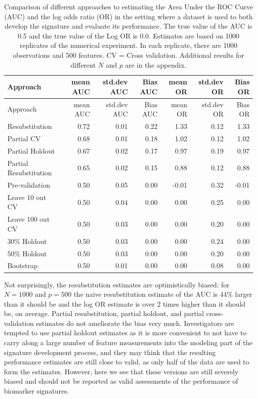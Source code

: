 \documentclass[11pt,]{article}
\begin{document}
\begin{longtable}[c]{@{}lrrrrrr@{}}
\caption{Comparison of different approaches to estimating the Area Under
the ROC Curve (AUC) and the log odds ratio (OR) in the setting where a
dataset is used to both develop the signature and evaluate its
performance. The true value of the AUC is 0.5 and the true value of the
Log OR is 0.0. Estimates are based on 1000 replicates of the numerical
experiment. In each replicate, there are 1000 observations and 500
features. CV = Cross validation. Additional results for different \(N\)
and \(p\) are in the appendix.}\tabularnewline
\toprule
Approach & mean AUC & std.dev AUC & Bias AUC & mean OR & std.dev OR &
Bias OR\tabularnewline
\midrule
\endfirsthead
\toprule
Approach & mean AUC & std.dev AUC & Bias AUC & mean OR & std.dev OR &
Bias OR\tabularnewline
\midrule
\endhead
Resubstitution & 0.72 & 0.01 & 0.22 & 1.33 & 0.12 & 1.33\tabularnewline
Partial CV & 0.68 & 0.01 & 0.18 & 1.02 & 0.12 & 1.02\tabularnewline
Partial Holdout & 0.67 & 0.02 & 0.17 & 0.97 & 0.19 & 0.97\tabularnewline
Partial Resubstitution & 0.65 & 0.02 & 0.15 & 0.88 & 0.12 &
0.88\tabularnewline
Pre-validation & 0.50 & 0.05 & 0.00 & -0.01 & 0.32 &
-0.01\tabularnewline
Leave 10 out CV & 0.50 & 0.04 & 0.00 & 0.00 & 0.25 & 0.00\tabularnewline
Leave 100 out CV & 0.50 & 0.03 & 0.00 & 0.00 & 0.20 &
0.00\tabularnewline
30\% Holdout & 0.50 & 0.03 & 0.00 & 0.00 & 0.24 & 0.00\tabularnewline
50\% Holdout & 0.50 & 0.03 & 0.00 & 0.00 & 0.20 & 0.00\tabularnewline
Bootstrap & 0.50 & 0.01 & 0.00 & 0.00 & 0.08 & 0.00\tabularnewline
\bottomrule
\end{longtable}

Not surprisingly, the resubstitution estimates are optimistically
biased: for \(N = 1000\) and \(p = 500\) the naive resubstitution
estimate of the AUC is 44\% larger than it should be and the log OR
estimate is over 2 times higher than it should be, on average. Partial
resubstitution, partial holdout, and partial cross-validation estimates
do not ameliorate the bias very much. Investigators are tempted to use
partial holdout estimates as it is more convenient to not have to carry
along a large number of feature measurements into the modeling part of
the signature development process, and they may think that the resulting
performance estimates are still close to valid, as only half of the data
are used to form the estimates. However, here we see that these versions
are still severely biased and should not be reported as valid
assessments of the performance of biomarker signatures.
\end{document}
